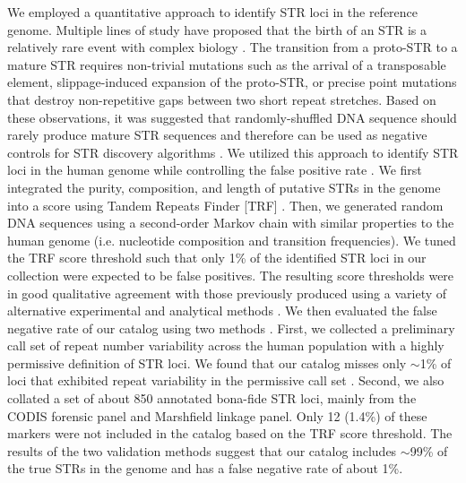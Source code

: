 We employed a quantitative approach to identify STR loci in the reference genome. Multiple lines of study have proposed that the birth of an STR is a relatively rare event with complex biology \cite{Ellegren2004,GemayelVincesLegendreEtAl2010,AnandaWalshJacobEtAl2012,BuschiazzoGemmell2006,OliverSlashinskiWangEtAl2012,KelkarEckertChiaromonteEtAl2011}. The transition from a proto-STR to a mature STR requires non-trivial mutations such as the arrival of a transposable element, slippage-induced expansion of the proto-STR, or precise point mutations that destroy non-repetitive gaps between two short repeat stretches. Based on these observations, it was suggested that randomly-shuffled DNA sequence should rarely produce mature STR sequences and therefore can be used as negative controls for STR discovery algorithms \cite{GemayelVincesLegendreEtAl2010,SchaperKajavaHauserEtAl2012}. We utilized this approach to identify STR loci in the human genome while controlling the false positive rate \cite{SuppWillemsGymrekHighnamEtAl2014}. We first integrated the purity, composition, and length of putative STRs in the genome into a score using Tandem Repeats Finder [TRF] \cite{Benson1999}. Then, we generated random DNA sequences using a second-order Markov chain with similar properties to the human genome (i.e. nucleotide composition and transition frequencies). We tuned the TRF score threshold such that only 1\% of the identified STR loci in our collection were expected to be false positives. The resulting score thresholds were in good qualitative agreement with those previously produced using a variety of alternative experimental and analytical methods \cite{LaiSun2003,FondonMartinRichardsEtAl2012,KelkarStrubczewskiHileEtAl2010} \cite{SuppWillemsGymrekHighnamEtAl2014}. We then evaluated the false negative rate of our catalog using two methods \cite{SuppWillemsGymrekHighnamEtAl2014}. First, we collected a preliminary call set of repeat number variability across the human population with a highly permissive definition of STR loci. We found that our catalog misses only $\sim$1\% of loci that exhibited repeat variability in the permissive call set \cite{SuppWillemsGymrekHighnamEtAl2014}. Second, we also collated a set of about 850 annotated bona-fide STR loci, mainly from the CODIS forensic panel and Marshfield linkage panel. Only 12 (1.4\%) of these markers were not included in the catalog based on the TRF score threshold. The results of the two validation methods suggest that our catalog includes $\sim$99\% of the true STRs in the genome and has a false negative rate of about 1\%. 

